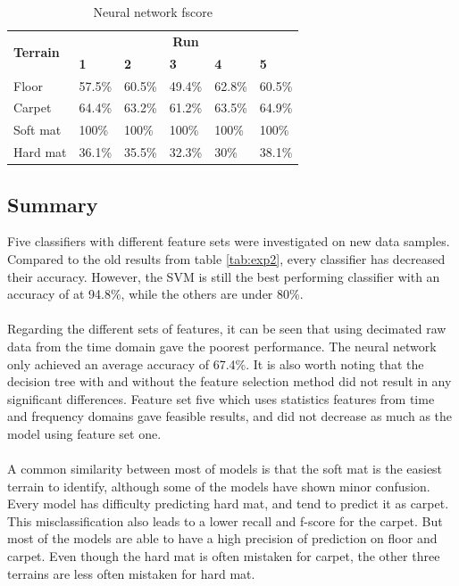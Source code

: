 \documentclass[USenglish]{ifimaster}  %
\begin{document}
	\begin{table}[h]
		\centering
		\begin{tabular}{@{}llllll@{}}
			\toprule
			\multirow{2}{*}{\textbf{Terrain}} & \multicolumn{5}{c}{\textbf{Run}} \\ \cmidrule(l){2-6} 
			& \multicolumn{1}{l|}{\textbf{1}} & \multicolumn{1}{l|}{\textbf{2}} & \multicolumn{1}{l|}{\textbf{3}} & \multicolumn{1}{l|}{\textbf{4}} & \textbf{5} \\ \midrule
			\multicolumn{1}{l|}{Floor} & \multicolumn{1}{l|}{57.5\%} & \multicolumn{1}{l|}{60.5\%} & \multicolumn{1}{l|}{49.4\%} & \multicolumn{1}{l|}{62.8\%} & 60.5\% \\ \midrule
			\multicolumn{1}{l|}{Carpet} & \multicolumn{1}{l|}{64.4\%} & \multicolumn{1}{l|}{63.2\%} & \multicolumn{1}{l|}{61.2\%} & \multicolumn{1}{l|}{63.5\%} & 64.9\% \\ \midrule
			\multicolumn{1}{l|}{Soft mat} & \multicolumn{1}{l|}{100\%} & \multicolumn{1}{l|}{100\%} & \multicolumn{1}{l|}{100\%} & \multicolumn{1}{l|}{100\%} & 100\% \\ \midrule
			\multicolumn{1}{l|}{Hard mat} & \multicolumn{1}{l|}{36.1\%} & \multicolumn{1}{l|}{35.5\%} & \multicolumn{1}{l|}{32.3\%} & \multicolumn{1}{l|}{30\%} & 38.1\% \\ \bottomrule
		\end{tabular}
		\caption{Neural network fscore}
		\label{nnfscore}
	\end{table}
	\FloatBarrier
	\newpage

\newpage
\subsection{Summary}
Five classifiers with different feature sets were investigated on new data samples. Compared to the old results from table \ref{tab:exp2}, every classifier has decreased their accuracy. However, the SVM is still the best performing classifier with an accuracy of at 94.8\%, while the others are under 80\%. 
\\
\\
Regarding the different sets of features, it can be seen that using decimated raw data from the time domain gave the poorest performance. The neural network only achieved an average accuracy of 67.4\%. It is also worth noting that the decision tree with and without the feature selection method did not result in any significant differences. Feature set five which uses statistics features from time and frequency domains gave feasible results, and did not decrease as much as the model using feature set one.
\\
\\
A common similarity between most of models is that the soft mat is the easiest terrain to identify, although some of the models have shown minor confusion. Every model has difficulty predicting hard mat, and tend to predict it as carpet. This misclassification also leads to a lower recall and f-score for the carpet. But most of the models are able to have a high precision of prediction on floor and carpet. Even though the hard mat is often mistaken for carpet, the other three terrains are less often mistaken for hard mat.
\end{document}
